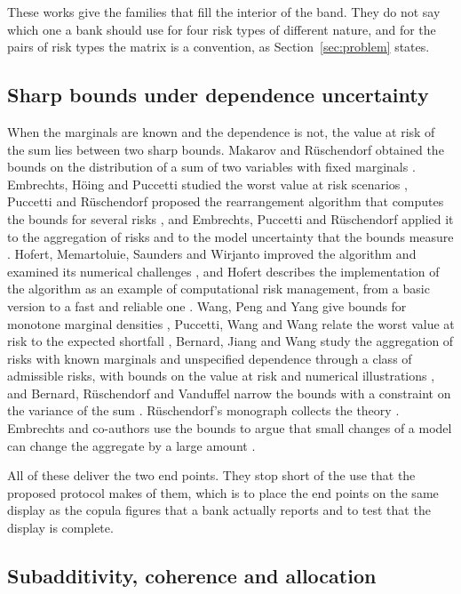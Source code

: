 These works give the families that fill the interior of the band. They do not say which one a bank should use for four risk types
of different nature, and for the pairs of risk types the matrix is a convention, as Section~\ref{sec:problem} states.

\subsection{Sharp bounds under dependence uncertainty}
\label{sec:rw-bounds}

When the marginals are known and the dependence is not, the value at risk of the sum lies between two sharp bounds. Makarov and
R\"uschendorf obtained the bounds on the distribution of a sum of two variables with fixed marginals \citep{makarov1981,
ruschendorf1982}. Embrechts, H\"oing and Puccetti studied the worst value at risk scenarios \citep{worstvar2005}, Puccetti and
R\"uschendorf proposed the rearrangement algorithm that computes the bounds for several risks \citep{puccetti2012}, and Embrechts,
Puccetti and R\"uschendorf applied it to the aggregation of risks and to the model uncertainty that the bounds measure
\citep{epr2013}. Hofert, Memartoluie, Saunders and Wirjanto improved the algorithm and examined its numerical challenges
\citep{hofert2015}, and Hofert describes the implementation of the algorithm as an example of computational risk management, from a basic version to a fast and reliable one \citep{hofert2020}. Wang, Peng and Yang
give bounds for monotone marginal densities \citep{wpy2013}, Puccetti, Wang and Wang relate the worst value at risk to the
expected shortfall \citep{pww2013}, Bernard, Jiang and Wang study the aggregation of risks with known marginals and unspecified dependence through a class of
admissible risks, with bounds on the value at risk and numerical illustrations \citep{bjw2014}, and Bernard, R\"uschendorf and Vanduffel narrow the bounds with a constraint on the variance of the sum
\citep{brv2015}. R\"uschendorf's monograph collects the theory \citep{ruschendorf2013}. Embrechts and co-authors use the bounds to
argue that small changes of a model can change the aggregate by a large amount \citep{academic2014}.

All of these deliver the two end points. They stop short of the use that the proposed protocol makes of them, which is to place the
end points on the same display as the copula figures that a bank actually reports and to test that the display is complete.

\subsection{Subadditivity, coherence and allocation}
\label{sec:rw-subadditivity}

